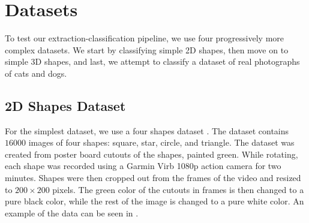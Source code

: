 \chapter{Datasets}
To test our extraction-classification pipeline, we use four progressively more complex datasets. We start by classifying simple 2D shapes, then move on to simple 3D shapes, and last, we attempt to classify a dataset of real photographs of cats and dogs.

\section{2D Shapes Dataset}
For the simplest dataset, we use a four shapes dataset \cite{kaggleFourShapes}. The dataset contains $16000$ images of four shapes: square, star, circle, and triangle. The dataset was created from poster board cutouts of the shapes, painted green. While rotating, each shape was recorded using a Garmin Virb 1080p action camera for two minutes. Shapes were then cropped out from the frames of the video and resized to $200\times200$ pixels. The green color of the cutouts in frames is then changed to a pure black color, while the rest of the image is changed to a pure white color. An example of the data can be seen in .

